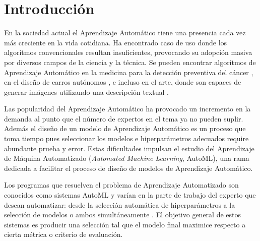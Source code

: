 \chapter*{Introducción}\label{chapter:introduction}
En la sociedad actual el Aprendizaje Autom\'atico tiene una presencia cada vez m\'as creciente en la vida cotidiana. Ha encontrado caso de uso donde los algoritmos convencionales resultan insuficientes, provocando su adopci\'on masiva por diversos campos de la ciencia y la t\'ecnica.
Se pueden encontrar algoritmos de Aprendizaje Autom\'atico en la medicina para la detecci\'on preventiva del c\'ancer , en el dise\~no de carros aut\'onomos , e incluso en el arte, donde son capaces de generar im\'agenes utilizando una descripci\'on textual .

Las popularidad del Aprendizaje Autom\'atico ha provocado un incremento en la demanda al punto que el n\'umero de expertos en el tema ya no pueden suplir. Adem\'as el dise\~no de un modelo de Aprendizaje Autom\'atico es un proceso que toma tiempo pues seleccionar los modelos e hiperpar\'ametros adecuados require abundante prueba y error.
Estas dificultades impulsan el estudio del Aprendizaje de M\'aquina Automatizado (\textit{Automated Machine Learning}, AutoML), una rama dedicada a facilitar el proceso de dise\~no de modelos de Aprendizaje Autom\'atico.

Los programas que resuelven el problema de Aprendizaje Automatizado son conocidos como sistemas AutoML y var\'ian en la parte de trabajo del experto que desean automatizar: desde la selecci\'on autom\'atica de hiperpar\'ametros  a la selecci\'on de modelos  o ambos  simult\'aneamente . El objetivo general de estos sistemas es producir una selecci\'on tal que el modelo final maximice respecto a cierta m\'etrica o criterio de evaluaci\'on. 


